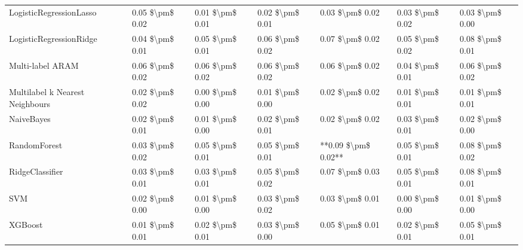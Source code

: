 \begin{tabular}{lllllll}
LogisticRegressionLasso         &  0.05 \$\textbackslash pm\$ 0.02 &           0.01 \$\textbackslash pm\$ 0.01 &       0.02 \$\textbackslash pm\$ 0.01 &        0.03 \$\textbackslash pm\$ 0.02 &                         0.03 \$\textbackslash pm\$ 0.02 &  0.03 \$\textbackslash pm\$ 0.00 \\
LogisticRegressionRidge         &  0.04 \$\textbackslash pm\$ 0.01 &           0.05 \$\textbackslash pm\$ 0.01 &       0.06 \$\textbackslash pm\$ 0.02 &        0.07 \$\textbackslash pm\$ 0.02 &                         0.05 \$\textbackslash pm\$ 0.02 &  0.08 \$\textbackslash pm\$ 0.01 \\
Multi-label ARAM                &  0.06 \$\textbackslash pm\$ 0.02 &           0.06 \$\textbackslash pm\$ 0.02 &       0.06 \$\textbackslash pm\$ 0.02 &        0.06 \$\textbackslash pm\$ 0.02 &                         0.04 \$\textbackslash pm\$ 0.01 &  0.06 \$\textbackslash pm\$ 0.02 \\
Multilabel k Nearest Neighbours &  0.02 \$\textbackslash pm\$ 0.02 &           0.00 \$\textbackslash pm\$ 0.00 &       0.01 \$\textbackslash pm\$ 0.00 &        0.02 \$\textbackslash pm\$ 0.02 &                         0.01 \$\textbackslash pm\$ 0.01 &  0.01 \$\textbackslash pm\$ 0.01 \\
NaiveBayes                      &  0.02 \$\textbackslash pm\$ 0.01 &           0.01 \$\textbackslash pm\$ 0.00 &       0.02 \$\textbackslash pm\$ 0.01 &        0.02 \$\textbackslash pm\$ 0.02 &                         0.03 \$\textbackslash pm\$ 0.01 &  0.02 \$\textbackslash pm\$ 0.00 \\
RandomForest                    &  0.03 \$\textbackslash pm\$ 0.02 &           0.05 \$\textbackslash pm\$ 0.01 &       0.05 \$\textbackslash pm\$ 0.01 &    **0.09 \$\textbackslash pm\$ 0.02** &                         0.05 \$\textbackslash pm\$ 0.01 &  0.08 \$\textbackslash pm\$ 0.02 \\
RidgeClassifier                 &  0.03 \$\textbackslash pm\$ 0.01 &           0.03 \$\textbackslash pm\$ 0.01 &       0.05 \$\textbackslash pm\$ 0.02 &        0.07 \$\textbackslash pm\$ 0.03 &                         0.05 \$\textbackslash pm\$ 0.01 &  0.08 \$\textbackslash pm\$ 0.01 \\
SVM                             &  0.02 \$\textbackslash pm\$ 0.00 &           0.01 \$\textbackslash pm\$ 0.00 &       0.03 \$\textbackslash pm\$ 0.02 &        0.03 \$\textbackslash pm\$ 0.01 &                         0.00 \$\textbackslash pm\$ 0.00 &  0.01 \$\textbackslash pm\$ 0.00 \\
XGBoost                         &  0.01 \$\textbackslash pm\$ 0.01 &           0.02 \$\textbackslash pm\$ 0.01 &       0.03 \$\textbackslash pm\$ 0.00 &        0.05 \$\textbackslash pm\$ 0.01 &                         0.02 \$\textbackslash pm\$ 0.01 &  0.05 \$\textbackslash pm\$ 0.01 \\
\bottomrule
\end{tabular}
